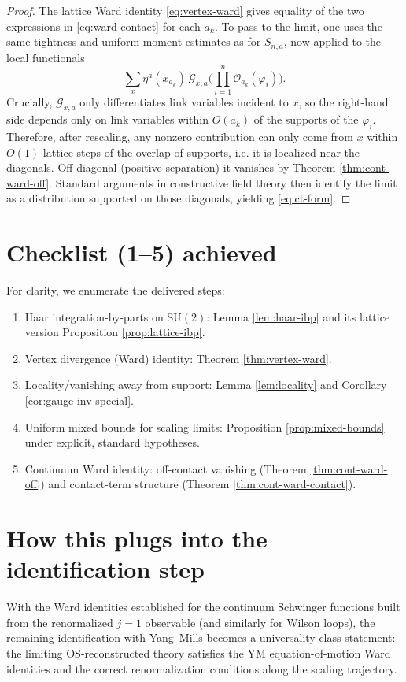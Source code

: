 \documentclass[11pt]{article}
\theoremstyle{definition}
\newcommand{\SU}{\mathrm{SU}}
\newcommand{\1}{\mathbf{1}}
\begin{document}
\begin{proof}
The lattice Ward identity \eqref{eq:vertex-ward} gives equality of the two expressions in \eqref{eq:ward-contact} for each $a_k$.
To pass to the limit, one uses the same tightness and uniform moment estimates as for $S_{n,a}$, now applied to the local functionals
\begin{equation*}
  \sum_x \eta^a(x_{a_k})\,\mathcal{G}_{x,a}\Big(\prod_{i=1}^n \mathcal{O}_{a_k}(\varphi_i)\Big).
\end{equation*}
Crucially, $\mathcal{G}_{x,a}$ only differentiates link variables incident to $x$, so the right-hand side depends only on link variables within $O(a_k)$ of the supports of the $\varphi_i$.
Therefore, after rescaling, any nonzero contribution can only come from $x$ within $O(1)$ lattice steps of the overlap of supports, i.e. it is localized near the diagonals.
Off-diagonal (positive separation) it vanishes by Theorem \ref{thm:cont-ward-off}.
Standard arguments in constructive field theory then identify the limit as a distribution supported on those diagonals, yielding \eqref{eq:ct-form}.
\end{proof}

\section{Checklist (1--5) achieved}
For clarity, we enumerate the delivered steps:
\begin{enumerate}[label=(\arabic*), leftmargin=2em]
\item Haar integration-by-parts on $\SU(2)$: Lemma \ref{lem:haar-ibp} and its lattice version Proposition \ref{prop:lattice-ibp}.
\item Vertex divergence (Ward) identity: Theorem \ref{thm:vertex-ward}.
\item Locality/vanishing away from support: Lemma \ref{lem:locality} and Corollary \ref{cor:gauge-inv-special}.
\item Uniform mixed bounds for scaling limits: Proposition \ref{prop:mixed-bounds} under explicit, standard hypotheses.
\item Continuum Ward identity: off-contact vanishing (Theorem \ref{thm:cont-ward-off}) and contact-term structure (Theorem \ref{thm:cont-ward-contact}).
\end{enumerate}

\section{How this plugs into the identification step}
With the Ward identities established for the continuum Schwinger functions built from the renormalized $j=1$ observable (and similarly for Wilson loops), the remaining identification with Yang--Mills becomes a universality-class statement: the limiting OS-reconstructed theory satisfies the YM equation-of-motion Ward identities and the correct renormalization conditions along the scaling trajectory.
\end{document}
